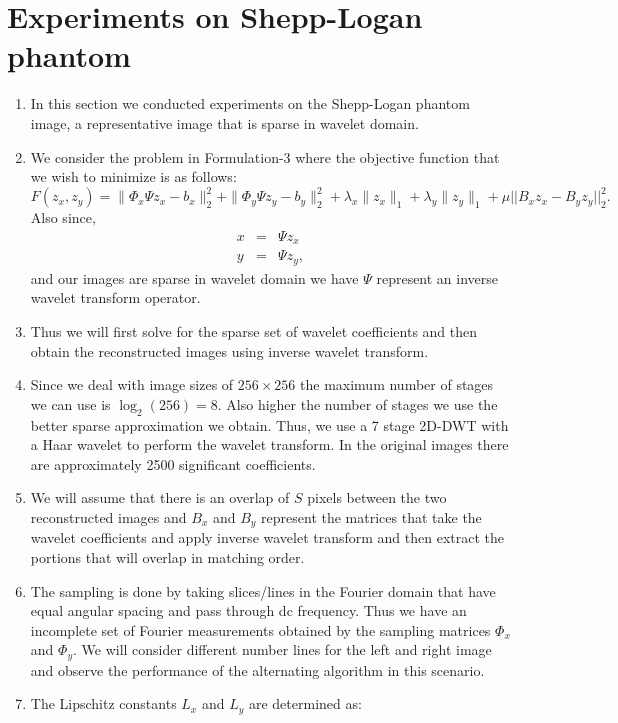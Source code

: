 \section{Experiments on Shepp-Logan phantom}
\begin{enumerate}
\item In this section we conducted experiments on the Shepp-Logan phantom image, a representative image that is sparse in wavelet domain.
\item We consider the problem in Formulation-3 where the objective function that we wish to minimize is as follows:
 \begin{equation}
 F(z_x, z_y) = \|\Phi_x\Psi z_x - b_x\|_2^2 + \|\Phi_y\Psi z_y - b_y\|_2^2 + \lambda_x \|z_x\|_1 + \lambda_y \|z_y\|_1 + \mu || B_x z_x - B_y z_y||_2^2.
 \end{equation}
 Also since,
\begin{eqnarray}
	x &=& \Psi z_x 	\label{eq:domainx}\\
	y &=& \Psi z_y,
	\label{eq:domainy}
\end{eqnarray}
and our images are sparse in wavelet domain we have $\Psi$ represent an inverse wavelet transform operator.
\item Thus we will first solve for the sparse set of wavelet coefficients and then obtain the reconstructed images using inverse wavelet transform.
\item Since we deal with image sizes of $256 \times 256$ the maximum number of stages we can use is $\log_2(256) = 8$. Also higher the number of stages we use the better sparse approximation we obtain. Thus, we use a 7 stage 2D-DWT with a Haar wavelet to perform the wavelet transform.  In the original images there are approximately 2500 significant coefficients.
\item We will assume that there is an overlap of $S$ pixels between the two reconstructed images and $B_x$ and $B_y$ represent the matrices that take the wavelet coefficients and apply inverse wavelet transform and then extract the portions that will overlap in matching order.
\item The sampling is done by taking slices/lines in the Fourier domain that have equal angular spacing and pass through dc frequency. Thus we have an incomplete set of Fourier measurements obtained by the sampling matrices $\Phi_x$ and $\Phi_y$. We will consider different number lines for the left and right image and observe the performance of the alternating algorithm in this scenario.
\item The Lipschitz constants $L_x$ and $L_y$ are determined as:

\end{enumerate}
